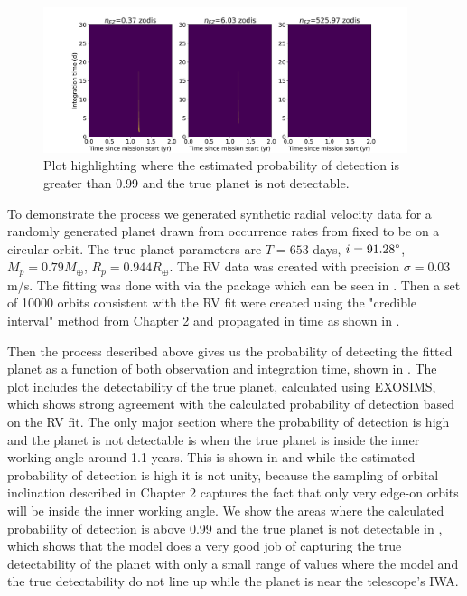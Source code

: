 \begin{figure}
  \begin{center}
    \includegraphics[width=0.95\textwidth]{ch3/figures/pdet_colored_true_err.png}
  \end{center}
  \caption{Plot highlighting where the estimated probability of detection is greater
  than 0.99 and the true planet is not detectable.}
  \label{fig:pdet_colored_true_err}
\end{figure}


To demonstrate the process we generated synthetic radial velocity data for a
randomly generated planet drawn from occurrence rates from
\citet{dulzJointRadialVelocity2020} fixed to be on a circular orbit. The true
planet parameters are $T=653$ days, $i=91.28\degree$, $M_p=0.79 M_\oplus$, $R_p
= 0.944 R_\oplus$. The RV data was created with precision $\sigma=0.03$ m/s.
The fitting was done with  \citep{fultonRadvelRadialVelocity2018}
via the  package \citep{rosenthalCaliforniaLegacy2021} which can
be seen in . Then a set of 10000 orbits consistent with the RV
fit were created using the "credible interval" method from Chapter 2 and
propagated in time as shown in .

Then the process described above gives us the probability of detecting the
fitted planet as a function of both observation and integration time, shown in
. The plot includes the detectability of
the true planet, calculated using EXOSIMS, which shows strong agreement with
the calculated probability of detection based on the RV fit. The only major
section where the probability of detection is high and the planet is not
detectable is when the true planet is inside the inner working angle around 1.1
years. This is shown in  and while the
estimated probability of detection is high it is not unity, because the
sampling of orbital inclination described in Chapter 2 captures the fact that
only very edge-on orbits will be inside the inner working angle. We show
the areas where the calculated probability of detection is above 0.99 and the
true planet is not detectable in , which
shows that the model does a very good job of capturing the true detectability
of the planet with only a small range of values where the model and the true
detectability do not line up while the planet is near the telescope's IWA.

